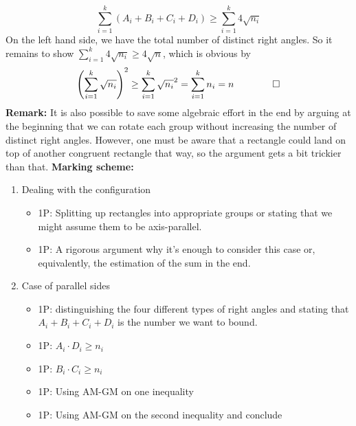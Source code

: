 \[
\sum_{i=1}^k (A_i+B_i+C_i+D_i) \geq \sum_{i=1}^k 4\sqrt{n_i}
\]
On the left hand side, we have the total number of distinct right angles. So it remains to show 
$\sum_{i=1}^k 4\sqrt{n_i} \geq 4\sqrt{n}$, which is obvious by
\[
\left(\sum_{i=1}^k \sqrt{n_i}\right)^2 \geq \sum_{i=1}^k \sqrt{n_i}^2 = \sum_{i=1}^k n_i = n \qquad \qed
\] 
\newpage
\textbf{Remark:} It is also possible to save some algebraic effort in the end by arguing at the beginning that we can rotate each group without increasing the number of distinct right angles. However, one must be aware that a rectangle could land on top of another congruent rectangle that way, so the argument gets a bit trickier than that. 
\newline
\newline
\textbf{Marking scheme:}
\begin{enumerate}
    \item Dealing with the configuration
\begin{itemize}
    \item 1P: Splitting up rectangles into appropriate groups or stating that we might assume them to be axis-parallel.
    \item 1P: A rigorous argument why it's enough to consider this case or, equivalently, the estimation of the sum in the end.
\end{itemize}

\item Case of parallel sides
\begin{itemize}
    \item 1P: distinguishing the four different types of right angles and stating that $A_i+B_i+C_i+D_i$ is the number we want to bound.
    \item 1P: $A_i \cdot D_i \geq n_i$
    \item 1P: $B_i \cdot C_i \geq n_i$
    \item 1P: Using AM-GM on one inequality
    \item 1P: Using AM-GM on the second inequality and conclude
\end{itemize}
\end{enumerate}